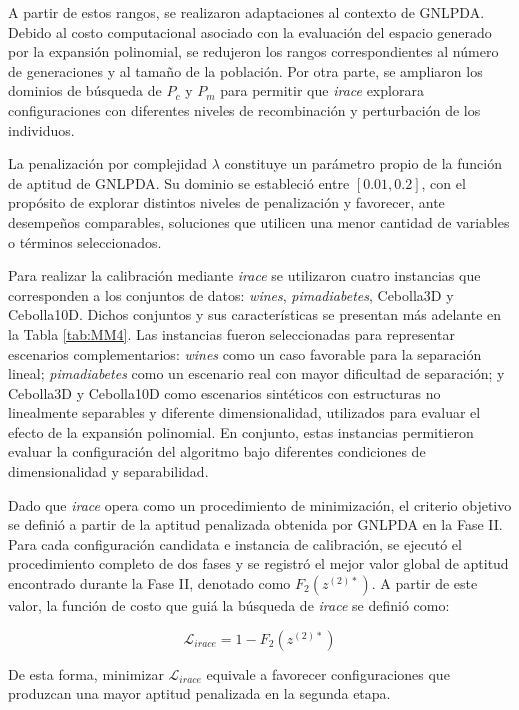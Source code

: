A partir de estos rangos, se realizaron adaptaciones al contexto de GNLPDA. Debido al costo computacional asociado con la evaluación del espacio generado por la expansión polinomial, se redujeron los rangos correspondientes al número de generaciones y al tamaño de la población. Por otra parte, se ampliaron los dominios de búsqueda de $P_c$ y $P_m$ para permitir que \textit{irace} explorara configuraciones con diferentes niveles de recombinación y perturbación de los individuos.

La penalización por complejidad $\lambda$ constituye un parámetro propio de la función de aptitud de GNLPDA. Su dominio se estableció entre $[0.01,0.2]$, con el propósito de explorar distintos niveles de penalización y favorecer, ante desempeños comparables, soluciones que utilicen una menor cantidad de variables o términos seleccionados.

Para realizar la calibración mediante \textit{irace} se utilizaron cuatro instancias que corresponden a los conjuntos de datos: \textit{wines}, \textit{pimadiabetes}, Cebolla3D y Cebolla10D. Dichos conjuntos y sus características se presentan más adelante en la Tabla \ref{tab:MM4}. Las instancias fueron seleccionadas para representar escenarios complementarios: 
\textit{wines} como un caso favorable para la separación lineal; \textit{pimadiabetes} como un escenario real con mayor dificultad de separación; y Cebolla3D y Cebolla10D como escenarios sintéticos con estructuras no linealmente separables y diferente dimensionalidad, utilizados para evaluar el efecto de la expansión polinomial. En conjunto, estas instancias permitieron evaluar la configuración del algoritmo bajo diferentes condiciones de dimensionalidad y separabilidad.

Dado que  \textit{irace} opera como un procedimiento de minimización, el criterio objetivo se definió a partir de la aptitud penalizada obtenida por GNLPDA en la Fase II. Para cada configuración candidata e instancia de calibración, se ejecutó el procedimiento completo de dos fases y se registró el mejor valor global de aptitud encontrado durante la Fase II, denotado como $F_2{(z^{(2)*})}$. A partir de este valor, la función de costo que guiá la búsqueda de \textit{irace} se definió como:

\begin{equation}
	\mathcal{L}_{irace} = 1-F_2{(z^{(2)*})}
	\label{eq:EM14}
\end{equation}

De esta forma, minimizar $\mathcal{L}_{irace}$ equivale a favorecer configuraciones que produzcan una mayor aptitud penalizada en la segunda etapa.

